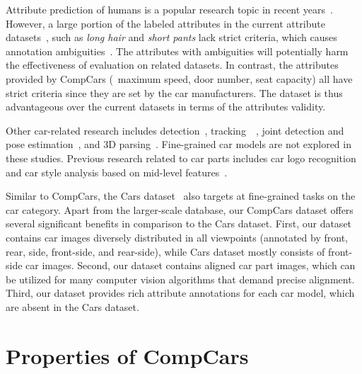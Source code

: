 \documentclass[10pt,twocolumn,letterpaper]{article}
\newcommand{\datasetName}{CompCars}
\begin{document}
Attribute prediction of humans is a popular research topic in recent years~\cite{Bourdev11,DengMM2014,Kumar09,Zhang14}. However, a large portion of the labeled attributes in the current attribute datasets~\cite{DengMM2014}, such as \emph{long hair} and \emph{short pants} lack strict criteria, which causes annotation ambiguities~\cite{Bourdev11}. The attributes with ambiguities will potentially harm the effectiveness of evaluation on related datasets. In contrast, the attributes provided by \datasetName{} (\eg~maximum speed, door number, seat capacity) all have strict criteria since they are set by the car manufacturers. The dataset is thus advantageous over the current datasets in terms of the attributes validity.

Other car-related research includes detection~\cite{Sun06}, tracking~\cite{Matei11}~\cite{Xiang14}, joint detection and pose estimation~\cite{He14, Yang14}, and 3D parsing~\cite{Zia14}. Fine-grained car models are not explored in these studies. Previous research related to car parts includes car logo recognition~\cite{Psyllos10} and car style analysis based on mid-level features~\cite{Lee13style}.

Similar to \datasetName{}, the Cars dataset~\cite{Krause13} also targets at fine-grained tasks on the car category. Apart from the larger-scale database, our \datasetName{} dataset offers several significant benefits in comparison to the Cars dataset.
%
First, our dataset contains car images diversely distributed in all viewpoints (annotated by front, rear, side, front-side, and rear-side), while Cars dataset mostly consists of front-side car images. Second, our dataset contains aligned car part images, which can be utilized for many computer vision algorithms that demand precise alignment. Third, our dataset provides rich attribute annotations for each car model, which are absent in the Cars dataset.

\section{Properties of \datasetName{}}\label{sec:dataset}
\end{document}
